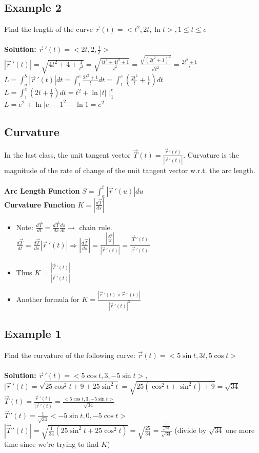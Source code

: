 \documentclass{article}
\begin{document}
\subsection{Example 2}
Find the length of the curve $\vec{r}(t)=<t^2,2t,\ln t>, 1\leq t\leq e$
\\\\\textbf{Solution:} $\vec{r}\,'(t)=<2t,2,\frac{1}{t}>$
\\$|\vec{r}\,'(t)|=\sqrt{4t^2+4+\frac{1}{t^2}}=\sqrt{\frac{4t^4+4t^2+1}{t^2}}=\frac{\sqrt{(2t^2+1)^2}}{\sqrt{t^2}}=\frac{2t^2+1}{t}$
\\$L=\int_{a}^{b} |\vec{r}\,'(t)|dt=\int_{1}^{e} \frac{2t^2+1}{t}dt=\int_{1}^{e} \left(\frac{2t^2}{t}+\frac{1}{t}\right)dt$
\\$L=\int_{1}^{e} \left(2t+\frac{1}{t}\right)dt=t^2+\ln |t|\,\,|_{1}^{e}$
\\$L=e^2+\ln |e|-1^2-\ln 1=e^2$

\newpage
\subsection{Curvature}
In the last class, the unit tangent vector $\vec{T}(t)=\frac{\vec{r}\,'(t)}{|\vec{r}\,'(t)|}$.
Curvature is the magnitude of the rate of change of the unit tangent vector w.r.t. the arc length.
\\\\\textbf{Arc Length Function} $S=\int_{a}^{t}\left|\vec{r}\,'(u) \right|du$
\\\textbf{Curvature Function} $K=\left|\frac{d\vec{T}}{ds}\right|$
\begin{itemize}
    \item Note: $\frac{d\vec{T}}{dt}=\frac{d\vec{T}}{ds}\frac{ds}{dt} \rightarrow$ chain rule.
    \\ $\frac{d\vec{T}}{dt}=\frac{d\vec{T}}{ds}|\vec{r}\,'(t)|\Rightarrow \left|\frac{d\vec{T}}{ds}\right|=\frac{\left|\frac{d\vec{T}}{dt}\right|}{|\vec{r}\,'(t)|}=\frac{|\vec{T}\,'(t)|}{|\vec{r}\,'(t)|}$
    \item Thus $K=\frac{|\vec{T}\,'(t)|}{|\vec{r}\,'(t)|}$
    \item Another formula for $K=\frac{|\vec{r}\,'(t)\times\vec{r}\,''(t)|}{|\vec{r}\,'(t)|^3}$
\end{itemize}

\subsection{Example 1}
Find the curvature of the following curve: $\vec{r}(t)=<5\sin t,3t, 5\cos t>$
\\\\\textbf{Solution:} $\vec{r}\,'(t)=<5\cos t,3,-5\sin t>$, $|\vec{r}\,'(t)=\sqrt{25\cos^2t+9+25\sin^2t}=\sqrt{25(\cos^2t+\sin^2t)+9}=\sqrt{34}$
\\$\vec{T}(t)=\frac{\vec{r}\,'(t)}{|\vec{r}\,'(t)}=\frac{<5\cos t,3,-5\sin t>}{\sqrt{34}}$
\\$\vec{T}\,'(t)=\frac{1}{\sqrt{34}}<-5\sin t,0,-5\cos t>$
\\$\left|\vec{T}\,'(t)\right|=\sqrt{\frac{1}{34}\left(25\sin^2t+25\cos^2t\right)}=\sqrt{\frac{25}{34}}=\frac{\frac{5}{\sqrt{34}}}{\sqrt{34}}$ (divide by $\sqrt{34}$ one more time since we're trying to find $K$)
\end{document}
